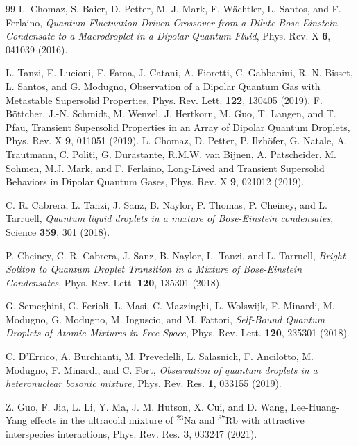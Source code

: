 \documentclass[reprint,aps,prl,twocolumn,superscriptaddress]{revtex4-1}
\begin{document}
\begin{thebibliography}{99}
 L. Chomaz, S. Baier, D. Petter, M. J. Mark, F. W{\"a}chtler, L. Santos, and F. Ferlaino, \textit{Quantum-Fluctuation-Driven Crossover from a Dilute Bose-Einstein Condensate to a Macrodroplet in a Dipolar Quantum Fluid}, Phys. Rev. X {\bf 6}, 041039 (2016).

L. Tanzi, E. Lucioni, F. Fama, J. Catani, A. Fioretti, C. Gabbanini, R. N. Bisset, L. Santos, and G. Modugno, Observation of a Dipolar Quantum Gas with Metastable Supersolid Properties, Phys. Rev. Lett. {\bf 122}, 130405 (2019).
F. B{\" o}ttcher, J.-N. Schmidt, M. Wenzel, J. Hertkorn, M. Guo, T. Langen, and T. Pfau, Transient Supersolid Properties in an Array of Dipolar Quantum Droplets, Phys. Rev. X {\bf 9}, 011051 (2019).
L. Chomaz, D. Petter, P. Ilzh{\"{o}}fer, G. Natale, A. Trautmann, C. Politi, G. Durastante, R.M.W. van Bijnen, A. Patscheider, M. Sohmen, M.J. Mark, and F. Ferlaino, Long-Lived and Transient Supersolid Behaviors in Dipolar Quantum Gases, Phys. Rev. X {\bf 9}, 021012 (2019).


 C. R. Cabrera, L. Tanzi, J. Sanz, B. Naylor, P. Thomas, P. Cheiney, and L. Tarruell, \textit{Quantum liquid droplets in a mixture of Bose-Einstein condensates}, Science {\bf 359}, 301 (2018).


 P. Cheiney, C. R. Cabrera, J. Sanz, B. Naylor, L. Tanzi, and L. Tarruell, \textit{Bright Soliton to Quantum Droplet Transition in a Mixture of Bose-Einstein Condensates}, Phys. Rev. Lett. {\bf 120}, 135301 (2018).

 G. Semeghini, G. Ferioli, L. Masi, C. Mazzinghi, L. Wolswijk, F. Minardi, M. Modugno, G. Modugno, M. Inguscio, and M. Fattori, \textit{Self-Bound Quantum Droplets of Atomic Mixtures in Free Space}, Phys. Rev. Lett. {\bf 120}, 235301 (2018).


 C. D'Errico, A. Burchianti, M. Prevedelli, L. Salasnich, F. Ancilotto, M. Modugno, F. Minardi, and C. Fort, \textit{Observation of quantum droplets in a heteronuclear bosonic mixture}, Phys. Rev. Res. {\bf 1}, 033155 (2019).

Z. Guo, F. Jia, L. Li, Y. Ma, J. M. Hutson, X. Cui, and D. Wang, Lee-Huang-Yang effects in the ultracold mixture of $^{23}$Na and $^{87}$Rb with attractive interspecies interactions, Phys. Rev. Res. {\bf 3}, 033247 (2021).



\end{thebibliography}
\end{document}
